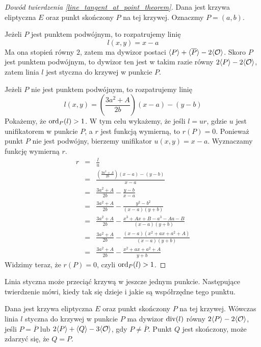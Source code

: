 \begin{proof}[Dowód twierdzenia \ref{line_tangent_at_point_theorem}]
Dana jest krzywa eliptyczna $E$
oraz punkt skończony $P$ na tej krzywej.
Oznaczmy $P = (a, b)$.

Jeżeli $P$ jest punktem podwójnym,
to rozpatrujemy linię
\begin{equation*}
l(x, y) = x - a
\end{equation*}
Ma ona stopień równy $2$,
zatem ma dywizor postaci $\langle P\rangle + \langle\overline{P}\rangle - 2\langle\mathcal{O}\rangle$.
Skoro $P$ jest punktem podwójnym, to dywizor ten jest w takim razie równy
$2\langle P\rangle - 2\langle\mathcal{O}\rangle$,
zatem linia $l$ jest styczna do krzywej w punkcie $P$.

Jeżeli $P$ nie jest punktem podwójnym,
to rozpatrujemy linię
\begin{equation*}
l(x, y) = \left(\frac{3a^2 + A}{2b}\right)(x - a) - (y - b)
\end{equation*}
Pokażemy, że $\operatorname{ord}_P(l) > 1$.
W tym celu wykażemy, że jeśli $l = ur$,
gdzie $u$ jest unifikatorem w punkcie $P$,
a $r$ jest funkcją wymierną,
to $r(P) = 0$.
Ponieważ punkt $P$ nie jest podwójny,
bierzemy unifikator $u(x, y) = x - a$.
Wyznaczamy funkcję wymierną $r$.
\begin{eqnarray*}
r
& = & \frac{l}{u} \\
& = & \frac{\left(\frac{3a^2+A}{2b}\right)(x-a) - (y-b)}{x-a} \\
& = & \frac{3a^2+A}{2b} - \frac{y-b}{x-a} \\
& = & \frac{3a^2+A}{2b} - \frac{y^2-b^2}{(x-a)(y+b)} \\
& = & \frac{3a^2+A}{2b} - \frac{x^3+Ax+B - a^3-Aa-B}{(x-a)(y+b)} \\
& = & \frac{3a^2+A}{2b} - \frac{(x-a)(x^2+ax+a^2+A)}{(x-a)(y+b)} \\
& = & \frac{3a^2+A}{2b} - \frac{x^2+ax+a^2+A}{y+b}
\end{eqnarray*}
Widzimy teraz, że $r(P) = 0$,
czyli $\operatorname{ord}_P(l) > 1$.
\end{proof}

Linia styczna może przeciąć krzywą w jeszcze jednym punkcie.
Następujące twierdzenie mówi,
kiedy tak się dzieje
i jakie są współrzędne tego punktu.

\begin{theorem}
Dana jest krzywa eliptyczna $E$
oraz punkt skończony $P$ na tej krzywej.
Wówczas linia $l$ styczna do krzywej w punkcie $P$
ma dywizor $\operatorname{div}(l)$ równy $2\langle P\rangle - 2\langle\mathcal{O}\rangle$,
jeśli $P = \overline{P}$
lub $2\langle P\rangle + \langle Q\rangle - 3\langle\mathcal{O}\rangle$,
gdy $P \neq \overline{P}$.
Punkt $Q$ jest skończony,
może zdarzyć się, że $Q = P$.
\end{theorem}

